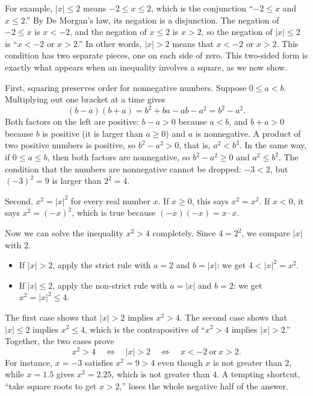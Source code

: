 For example, $|x|\le2$ means $-2\le x\le2$, which is the conjunction ``$-2\le x$ and $x\le2$.'' By De Morgan's law, its negation is a disjunction. The negation of $-2\le x$ is $x<-2$, and the negation of $x\le2$ is $x>2$, so the negation of $|x|\le2$ is ``$x<-2$ or $x>2$.'' In other words, $|x|>2$ means that $x<-2$ or $x>2$. This condition has two separate pieces, one on each side of zero. This two-sided form is exactly what appears when an inequality involves a square, as we now show.

First, squaring preserves order for nonnegative numbers. Suppose $0\le a<b$. Multiplying out one bracket at a time gives
\[
(b-a)(b+a)=b^2+ba-ab-a^2=b^2-a^2.
\]
Both factors on the left are positive: $b-a>0$ because $a<b$, and $b+a>0$ because $b$ is positive (it is larger than $a\ge0$) and $a$ is nonnegative. A product of two positive numbers is positive, so $b^2-a^2>0$, that is, $a^2<b^2$. In the same way, if $0\le a\le b$, then both factors are nonnegative, so $b^2-a^2\ge0$ and $a^2\le b^2$. The condition that the numbers are nonnegative cannot be dropped: $-3<2$, but $(-3)^2=9$ is larger than $2^2=4$.

Second, $x^2=|x|^2$ for every real number $x$. If $x\ge0$, this says $x^2=x^2$. If $x<0$, it says $x^2=(-x)^2$, which is true because $(-x)(-x)=x\cdot x$.

Now we can solve the inequality $x^2>4$ completely. Since $4=2^2$, we compare $|x|$ with $2$.
\begin{itemize}
\item If $|x|>2$, apply the strict rule with $a=2$ and $b=|x|$: we get $4<|x|^2=x^2$.
\item If $|x|\le2$, apply the non-strict rule with $a=|x|$ and $b=2$: we get $x^2=|x|^2\le4$.
\end{itemize}
The first case shows that $|x|>2$ implies $x^2>4$. The second case shows that $|x|\le2$ implies $x^2\le4$, which is the contrapositive of ``$x^2>4$ implies $|x|>2$.'' Together, the two cases prove
\[
x^2>4\quad\Longleftrightarrow\quad|x|>2\quad\Longleftrightarrow\quad x<-2\ \text{or}\ x>2.
\]
For instance, $x=-3$ satisfies $x^2=9>4$ even though $x$ is not greater than $2$, while $x=1.5$ gives $x^2=2.25$, which is not greater than $4$. A tempting shortcut, ``take square roots to get $x>2$,'' loses the whole negative half of the answer.

